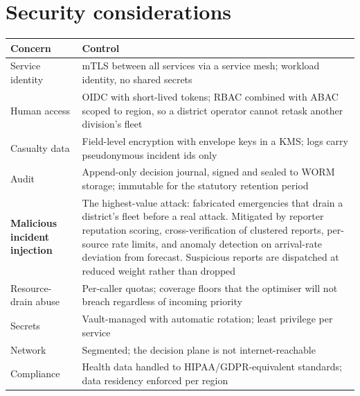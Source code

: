 \section{Security considerations}

\begin{center}\footnotesize
\begin{tabular}{@{}lp{88mm}@{}}
\toprule
\textbf{Concern} & \textbf{Control} \\
\midrule
Service identity & mTLS between all services via a service mesh; workload identity, no shared secrets \\
Human access & OIDC with short-lived tokens; RBAC combined with ABAC scoped to region, so a district operator cannot retask another division's fleet \\
Casualty data & Field-level encryption with envelope keys in a KMS; logs carry pseudonymous incident ids only \\
Audit & Append-only decision journal, signed and sealed to WORM storage; immutable for the statutory retention period \\
\textbf{Malicious incident injection} & The highest-value attack: fabricated emergencies that drain a district's fleet before a real attack. Mitigated by reporter reputation scoring, cross-verification of clustered reports, per-source rate limits, and anomaly detection on arrival-rate deviation from forecast. Suspicious reports are dispatched at reduced weight rather than dropped \\
Resource-drain abuse & Per-caller quotas; coverage floors that the optimiser will not breach regardless of incoming priority \\
Secrets & Vault-managed with automatic rotation; least privilege per service \\
Network & Segmented; the decision plane is not internet-reachable \\
Compliance & Health data handled to HIPAA/GDPR-equivalent standards; data residency enforced per region \\
\bottomrule
\end{tabular}
\end{center}

\begin{decbox}
\end{decbox}


